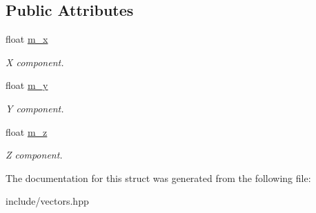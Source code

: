 \subsection*{Public Attributes}
\begin{DoxyCompactItemize}
\item 
\hypertarget{structvec3_a7baf8cd2e43153fe142a54a7fd2f163e}{float \hyperlink{structvec3_a7baf8cd2e43153fe142a54a7fd2f163e}{m\-\_\-x}}\label{structvec3_a7baf8cd2e43153fe142a54a7fd2f163e}

\begin{DoxyCompactList}\small\item\em X component. \end{DoxyCompactList}\item 
\hypertarget{structvec3_a7df7904262a2155dc5f0a47cc171531c}{float \hyperlink{structvec3_a7df7904262a2155dc5f0a47cc171531c}{m\-\_\-y}}\label{structvec3_a7df7904262a2155dc5f0a47cc171531c}

\begin{DoxyCompactList}\small\item\em Y component. \end{DoxyCompactList}\item 
\hypertarget{structvec3_aaad81c20b8789189da5be2af7371bda3}{float \hyperlink{structvec3_aaad81c20b8789189da5be2af7371bda3}{m\-\_\-z}}\label{structvec3_aaad81c20b8789189da5be2af7371bda3}

\begin{DoxyCompactList}\small\item\em Z component. \end{DoxyCompactList}\end{DoxyCompactItemize}


The documentation for this struct was generated from the following file\-:\begin{DoxyCompactItemize}
\item 
include/vectors.\-hpp\end{DoxyCompactItemize}
